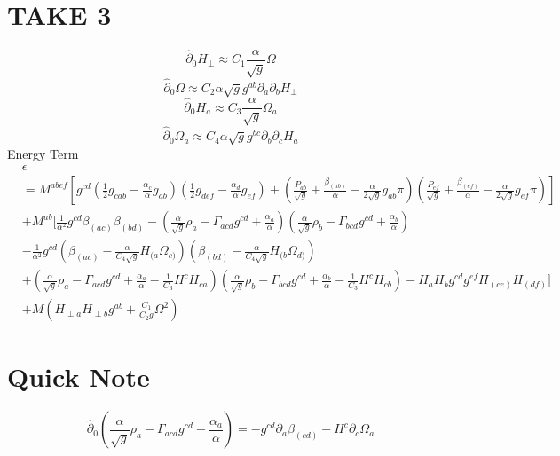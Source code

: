 \documentclass{article}
\begin{document}
\section{TAKE 3}
\[
{\hat \partial}_{0}H_{\perp} \approx C_{1}\frac{\alpha}{\sqrt{g}}\Omega
\]
\[
{\hat \partial}_{0}\Omega \approx C_{2}\alpha \sqrt{g}g^{ab}\partial_{a}\partial_{b}H_{\perp}
\]
\[
{\hat \partial}_{0}H_{a} \approx C_{3}\frac{\alpha}{\sqrt{g}}\Omega_{a}
\]
\[
{\hat \partial}_{0}\Omega_{a} \approx C_{4}\alpha \sqrt{g} g^{bc}\partial_{b}\partial_{c}H_{a}
\]
Energy Term
\begin{align*}
& \epsilon \\
& = M^{abef}\left[g^{cd}\left(\frac{1}{2}g_{cab} - \frac{\alpha_{c}}{\alpha}g_{ab}\right)\left(\frac{1}{2}g_{def} - \frac{\alpha_{d}}{\alpha}g_{ef}\right) + \left(\frac{P_{ab}}{\sqrt{g}} + \frac{\beta_{(ab)}}{\alpha} - \frac{\alpha}{2\sqrt{g}}g_{ab}\pi \right)\left(\frac{P_{ef}}{\sqrt{g}} + \frac{\beta_{(ef)}}{\alpha} - \frac{\alpha}{2\sqrt{g}}g_{ef}\pi\right)\right]\\
& + M^{ab}\Big[\frac{1}{\alpha^{2}}g^{cd}\beta_{(ac)}\beta_{(bd)} - \left(\frac{\alpha}{\sqrt{g}}\rho_{a} - \Gamma_{acd}g^{cd} + \frac{\alpha_{a}}{\alpha}\right)\left(\frac{\alpha}{\sqrt{g}}\rho_{b} - \Gamma_{bcd}g^{cd} + \frac{\alpha_{b}}{\alpha}\right)\\
& - \frac{1}{\alpha^{2}}g^{cd}\left(\beta_{(ac)} - \frac{\alpha}{C_{4}\sqrt{g}}H_{(a}\Omega_{c)}\right)\left(\beta_{(bd)} - \frac{\alpha}{C_{4}\sqrt{g}}H_{(b}\Omega_{d)}\right)\\
& + \left(\frac{\alpha}{\sqrt{g}}\rho_{a} - \Gamma_{acd}g^{cd} + \frac{\alpha_{a}}{\alpha} - \frac{1}{C_{3}}H^{c}H_{ca}\right)\left(\frac{\alpha}{\sqrt{g}}\rho_{b} - \Gamma_{bcd}g^{cd} + \frac{\alpha_{b}}{\alpha} - \frac{1}{C_{3}}H^{c}H_{cb}\right) - H_{a}H_{b}g^{cd}g^{ef}H_{(ce)}H_{(df)}\Big]\\
& + M\left(H_{\perp a}H_{\perp b}g^{ab} +\frac{C_{1}}{C_{2}g}\Omega^{2} \right)
\end{align*}
\section{Quick Note}
\[
{\hat \partial}_{0}\left(\frac{\alpha}{\sqrt{g}}\rho_{a} - \Gamma_{acd}g^{cd} + \frac{\alpha_{a}}{\alpha} \right) = -g^{cd}\partial_{a}\beta_{(cd)} - H^{c}\partial_{c}\Omega_{a}
\]
\end{document}
